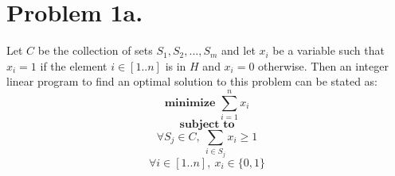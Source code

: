 \documentclass[12pt]{article}
\begin{document}
\pagestyle{plain}
\titleformat{\subsection}[runin]
  {\normalfont\large\bfseries}{\thesubsection}{1em}{}
\titleformat{\subsubsection}[runin]
  {\normalfont\large\bfseries}{\thesubsubsection}{1em}{}

\section*{Problem 1a.}
Let $C$ be the collection of sets $S_1, S_2, ...,S_m$ and let $x_i$ be a
variable such that $x_i = 1$ if the element $i \in [1..n]$ is in $H$ and
$x_i = 0$ otherwise. Then an integer linear program to find an optimal solution
to this problem can be stated as:
$$ \textbf{minimize } \sum_{i=1}^n x_i $$
$$ \textbf{ subject to } $$
$$ \forall S_j \in C,\ \sum_{i \in S_j} x_i \ge 1 $$
$$ \forall i \in [1..n],\ x_i \in \{0,1\} $$
\end{document}
